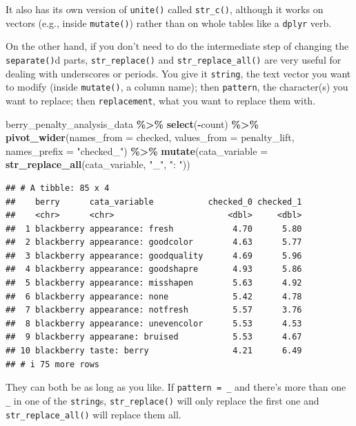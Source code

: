 \documentclass[
]{book}
\newenvironment{Shaded}{\begin{snugshade}}{\end{snugshade}}
\newcommand{\AttributeTok}[1]{\textcolor[rgb]{0.13,0.29,0.53}{#1}}
\newcommand{\FunctionTok}[1]{\textcolor[rgb]{0.13,0.29,0.53}{\textbf{#1}}}
\newcommand{\NormalTok}[1]{#1}
\newcommand{\SpecialCharTok}[1]{\textcolor[rgb]{0.81,0.36,0.00}{\textbf{#1}}}
\newcommand{\StringTok}[1]{\textcolor[rgb]{0.31,0.60,0.02}{#1}}
\begin{document}
It also has its own version of \texttt{unite()} called \texttt{str\_c()}, although it works on vectors (e.g., inside \texttt{mutate()}) rather than on whole tables like a \texttt{dplyr} verb.

On the other hand, if you don't need to do the intermediate step of changing the \texttt{separate()}d parts, \texttt{str\_replace()} and \texttt{str\_replace\_all()} are very useful for dealing with underscores or periods. You give it \texttt{string}, the text vector you want to modify (inside \texttt{mutate()}, a column name); then \texttt{pattern}, the character(s) you want to replace; then \texttt{replacement}, what you want to replace them with.

\begin{Shaded}
\begin{Highlighting}[]
\NormalTok{berry\_penalty\_analysis\_data }\SpecialCharTok{\%\textgreater{}\%}
  \FunctionTok{select}\NormalTok{(}\SpecialCharTok{{-}}\NormalTok{count) }\SpecialCharTok{\%\textgreater{}\%}
  \FunctionTok{pivot\_wider}\NormalTok{(}\AttributeTok{names\_from =}\NormalTok{ checked,}
              \AttributeTok{values\_from =}\NormalTok{ penalty\_lift,}
              \AttributeTok{names\_prefix =} \StringTok{"checked\_"}\NormalTok{) }\SpecialCharTok{\%\textgreater{}\%}
  \FunctionTok{mutate}\NormalTok{(}\AttributeTok{cata\_variable =} \FunctionTok{str\_replace\_all}\NormalTok{(cata\_variable, }\StringTok{"\_"}\NormalTok{, }\StringTok{": "}\NormalTok{))}
\end{Highlighting}
\end{Shaded}

\begin{verbatim}
## # A tibble: 85 x 4
##    berry      cata_variable           checked_0 checked_1
##    <chr>      <chr>                       <dbl>     <dbl>
##  1 blackberry appearance: fresh            4.70      5.80
##  2 blackberry appearance: goodcolor        4.63      5.77
##  3 blackberry appearance: goodquality      4.69      5.96
##  4 blackberry appearance: goodshapre       4.93      5.86
##  5 blackberry appearance: misshapen        5.63      4.92
##  6 blackberry appearance: none             5.42      4.78
##  7 blackberry appearance: notfresh         5.57      3.76
##  8 blackberry appearance: unevencolor      5.53      4.53
##  9 blackberry appearane: bruised           5.53      4.67
## 10 blackberry taste: berry                 4.21      6.49
## # i 75 more rows
\end{verbatim}

They can both be as long as you like. If \texttt{pattern\ =\ \_} and there's more than one \texttt{\_} in one of the \texttt{string}s, \texttt{str\_replace()} will only replace the first one and \texttt{str\_replace\_all()} will replace them all.
\end{document}

